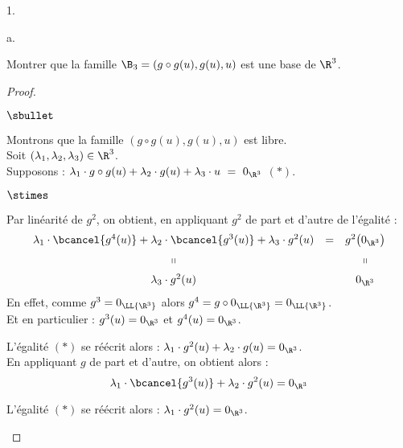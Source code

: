 \documentclass[11pt]{article}%
\begin{document}
\begin{noliste}{1.}
\begin{noliste}{a.}
  \item Montrer que la famille $\B_3 = (g \circ g(u), g(u), u)$ est
    une base de $\R^3$.

    \begin{proof}~%
      \begin{noliste}{$\sbullet$}
      \item Montrons que la famille $(g \circ g(u), g(u), u)$ est libre.\\
	Soit $(\lambda_1, \lambda_2, \lambda_3) \in \R^3$.\\
        Supposons : $\lambda_1 \cdot g \circ g(u) +\lambda_2 \cdot
        g(u) + \lambda_3 \cdot u \ = \ 0_{\R^3}$ $(*)$.
        \begin{noliste}{$\stimes$}
        \item Par linéarité de $g^2$, on obtient, en appliquant $g^2$ de
          part et d'autre de l'égalité :
          \[
          \begin{array}{ccc}
            \lambda_1 \cdot \bcancel{g^4(u)} + \lambda_2 \cdot
            \bcancel{g^3(u)} + \lambda_3 \cdot g^{2}(u) & = & g^2\big(
            0_{\R^3} \big) 
            \\[.2cm]
            \shortparallel & & \shortparallel
            \\[.2cm]
            \lambda_3 \cdot g^2(u) & & 0_{\R^3}
          \end{array}
          \]
          En effet, comme $g^3 = 0_{\LL{\R^3}}$ alors $g^4 = g \circ
          0_{\LL{\R^3}} = 0_{\LL{\R^3}}$.\\[.1cm]
          Et en particulier : $g^3(u) = 0_{\R^3}$ et $g^4(u) =
          0_{\R^3}$. %

        \item L'égalité $(*)$ se réécrit alors : $\lambda_1 \cdot
          g^2(u) + \lambda_2 \cdot g(u) = 0_{\R^3}$.\\
          En appliquant $g$ de part et d'autre, on obtient alors :
          \[
          \lambda_1 \cdot \bcancel{g^3(u)} + \lambda_2 \cdot g^2(u) =
          0_{\R^3}
          \]

        \item L'égalité $(*)$ se réécrit alors : $\lambda_1 \cdot
          g^{2}(u) = 0_{\R^3}$.%
        \end{noliste}



\end{noliste}
\end{proof}
\end{noliste}
\end{noliste}
\end{document}
